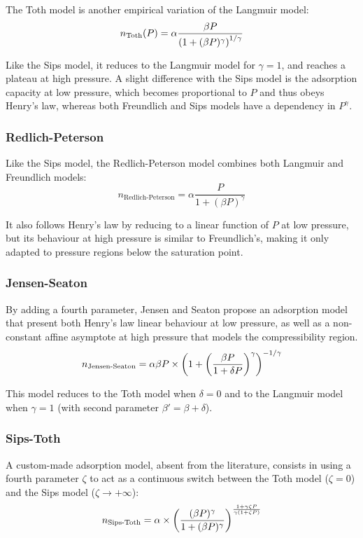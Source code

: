 \documentclass[main.tex]{subfiles}
\begin{document}
The Toth model is another empirical variation of the Langmuir model:
\[n_\text{Toth}(P) = \alpha\frac{\beta P}{\left(1 + (\beta P)^\gamma\right)^{1/\gamma}}\]

Like the Sips model, it reduces to the Langmuir model for $\gamma = 1$, and reaches a plateau at high pressure. A slight difference with the Sips model is the adsorption capacity at low pressure, which becomes proportional to $P$ and thus obeys Henry's law, whereas both Freundlich and Sips models have a dependency in $P^\gamma$.

\subsubsection{Redlich-Peterson}

Like the Sips model, the Redlich-Peterson model combines both Langmuir and Freundlich models:
\[n_\text{Redlich-Peterson} = \alpha\frac{P}{1+ (\beta P)^\gamma}\]

It also follows Henry's law by reducing to a linear function of $P$ at low pressure, but its behaviour at high pressure is similar to Freundlich's, making it only adapted to pressure regions below the saturation point.

\subsubsection{Jensen-Seaton}

By adding a fourth parameter, Jensen and Seaton %
propose an adsorption model that present both Henry's law linear behaviour at low pressure, as well as a non-constant affine asymptote at high pressure that models the compressibility region.
\[n_\text{Jensen-Seaton} = \alpha\beta P\times\left(1 + \left(\frac{\beta P}{1 + \delta P}\right)^\gamma\right)^{-1/\gamma}\]

This model reduces to the Toth model when $\delta = 0$ and to the Langmuir model when $\gamma = 1$ (with second parameter $\beta' = \beta+\delta$).%

\subsubsection{Sips-Toth}

A custom-made adsorption model, absent from the literature, consists in using a fourth parameter $\zeta$ to act as a continuous switch between the Toth model ($\zeta = 0$) and the Sips model ($\zeta \to +\infty$):
\[n_\text{Sips-Toth} = \alpha\times\left(\frac{(\beta P)^\gamma}{1 + (\beta P)^\gamma}\right)^{\frac{1 + \gamma\zeta P}{\gamma(1 + \zeta P)}}\]
\end{document}
